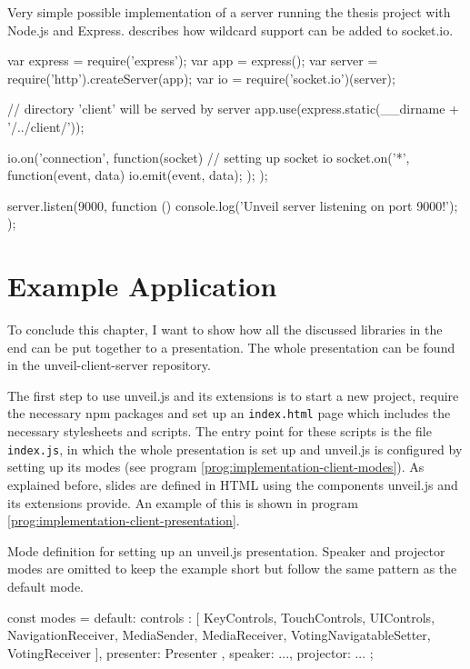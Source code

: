 \begin{program}
\caption{Very simple possible implementation of a server running the thesis project with Node.js and Express. \cite{socket-io-wildcards} describes how wildcard support can be added to socket.io.}
\label{prog:implementation-server-code}
\begin{JsCode}
var express = require('express'); var app = express();
var server = require('http').createServer(app);
var io = require('socket.io')(server);

// directory 'client' will be served by server
app.use(express.static(__dirname + '/../client/'));

io.on('connection', function(socket) { // setting up socket io
  socket.on('*', function(event, data) {
    io.emit(event, data);
  });
});

server.listen(9000, function () {
  console.log('Unveil server listening on port 9000!');
});
\end{JsCode}
\end{program}

\section{Example Application}
\label{sec:implementation-client}

To conclude this chapter, I want to show how all the discussed libraries in the end can be put together to a presentation. The whole presentation can be found in the unveil-client-server repository.

The first step to use unveil.js and its extensions is to start a new project, require the necessary npm packages and set up an \texttt{index.html} page which includes the necessary stylesheets and scripts.
The entry point for these scripts is the file \texttt{index.js}, in which the whole presentation is set up and unveil.js is configured by setting up its modes (see program \ref{prog:implementation-client-modes}). As explained before, slides are defined in HTML using the components unveil.js and its extensions provide. An example of this is shown in program \ref{prog:implementation-client-presentation}.

\begin{program}
\caption{Mode definition for setting up an unveil.js presentation. Speaker and projector modes are omitted to keep the example short but follow the same pattern as the default mode.}
\label{prog:implementation-client-modes}
\begin{JsCode}
const modes = {
  default: {
    controls : [
      KeyControls, TouchControls, UIControls,
      NavigationReceiver,
      MediaSender, MediaReceiver,
      VotingNavigatableSetter, VotingReceiver
    ],
    presenter: Presenter
  },
  speaker: {...},
  projector: {...}
};
\end{JsCode}
\end{program}

